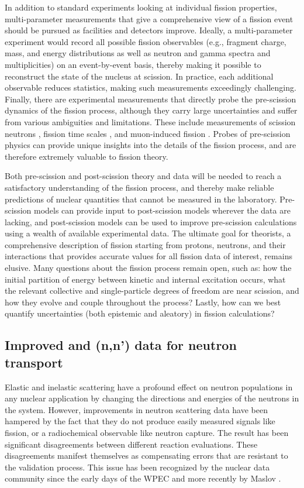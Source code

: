 \documentclass[letterpaper,draft]{ar-1col}
\begin{document}
In addition to standard experiments looking at individual fission properties, multi-parameter measurements that give a comprehensive view of a fission event should be pursued as facilities and detectors improve. Ideally, a multi-parameter experiment would record all possible fission observables (e.g., fragment charge, mass, and energy distributions as well as neutron and gamma spectra and multiplicities) on an event-by-event basis, thereby making it possible to reconstruct the state of the nucleus at scission. In practice, each additional observable reduces statistics, making such measurements exceedingly challenging. Finally, there are experimental measurements that directly probe the pre-scission dynamics of the fission process, although they carry large uncertainties and suffer from various ambiguities and limitations. These include measurements of scission neutrons \cite{Pe09}, fission time scales \cite{Jac09}, and muon-induced fission \cite{Mar80}. Probes of pre-scission physics can provide unique insights into the details of the fission process, and are therefore extremely valuable to fission theory.

Both pre-scission and post-scission theory and data will be needed to reach a satisfactory understanding of the fission process, and thereby make reliable predictions of nuclear quantities that cannot be measured in the laboratory. Pre-scission models can provide input to post-scission models wherever the data are lacking, and post-scission models can be used to improve pre-scission calculations using a wealth of available experimental data. The ultimate goal for theorists, a comprehensive description of fission starting from protons, neutrons, and their interactions that provides accurate values for all fission data of interest, remains elusive.  Many questions about the fission process remain open, such as: how the initial partition of energy between kinetic and internal excitation occurs, what the relevant collective and single-particle degrees of freedom are near scission, and how they evolve and couple throughout the process? Lastly, how can we best quantify uncertainties (both epistemic and aleatory) in fission calculations?

\subsection{Improved  and (n,n') data for neutron transport}\label{sec:n_transport}

Elastic and inelastic scattering have a profound effect on neutron populations in any nuclear application by changing the directions and energies of the neutrons in the system.  However, improvements in neutron scattering data have been hampered by the fact that they do not produce easily measured signals like fission, or a radiochemical observable like neutron capture.  The result has been significant disagreements between different reaction evaluations.  These disagreements manifest themselves as compensating errors that are resistant to the validation process.  This issue has been recognized by the nuclear data community since the early days of the WPEC \cite{Row89} and more recently by Maslov \cite{Mas11}.  
\end{document}
